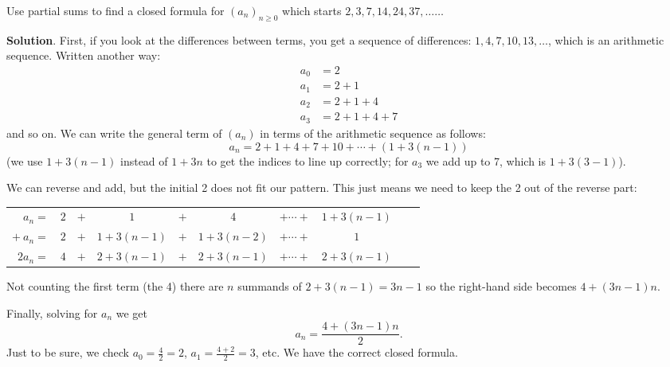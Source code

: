 \documentclass[11pt,]{book}
\theoremstyle{ptxplainnotitle}
\theoremstyle{ptxplaintitle}
\theoremstyle{ptxdefinitionnotitle}
\theoremstyle{ptxdefinitiontitle}
\theoremstyle{ptxdefinitionnotitle}
\theoremstyle{ptxdefinitiontitle}
\theoremstyle{ptxdefinitionnotitle}
\theoremstyle{ptxdefinitiontitle}
\theoremstyle{ptxdefinitiontitlenonumber}
\theoremstyle{ptxdefinitiontitlenonumber}
\numberwithin{equation}{chapter}
\newcommand{\hrulethin}  {\noalign{\hrule height 0.04em}}
\renewcommand{\d}{\displaystyle}
\newcommand{\amp}{&}
\begin{document}
\begin{example}\label{example-sum-of-arithmetic}
\hypertarget{p-203}{}%
Use partial sums to find a closed formula for \((a_n)_{n\ge 0}\) which starts \(2, 3, 7, 14, 24, 37,\ldots \ldots\)%
\par\smallskip%
\noindent\textbf{Solution}.\hypertarget{solution-17}{}\quad%
\hypertarget{p-204}{}%
First, if you look at the differences between terms, you get a sequence of differences: \(1,4,7,10,13, \ldots\), which is an arithmetic sequence.  Written another way:%
\begin{align*}
a_0 \amp = 2\\
a_1 \amp = 2+1\\
a_2 \amp = 2+1+4\\
a_3 \amp = 2+1+4+7
\end{align*}
and so on. We can write the general term of \((a_n)\) in terms of the arithmetic sequence as follows:%
\begin{equation*}
a_n = 2 + 1 + 4 + 7 + 10 + \cdots + (1+3(n-1))
\end{equation*}
(we use \(1+3(n-1)\) instead of \(1+3n\) to get the indices to line up correctly; for \(a_3\) we add up to 7, which is \(1+3(3-1)\)).%
\par
\hypertarget{p-205}{}%
We can reverse and add, but the initial 2 does not fit our pattern.  This just means we need to keep the 2 out of the reverse part:%
\begin{sidebyside}{1}{0}{0}{0}
\begin{sbspanel}{1}
{\centering%
\begin{tabular}{rccccccccc}
\(a_n  =\)&\(2\)&\(+\)&\(1\)&\(+\)&\(4\)&\(+ \cdots +\)&\(1+3(n-1)\)\tabularnewline[0pt]
\(+ ~ a_n  =\)&\(2\)&\(+\)&\(1+3(n-1)\)&\(+\)&\(1+3(n-2)\)&\(+ \cdots +\)&\(1\)\tabularnewline\hrulethin
\(2a_n =\)&\(4\)&\(+\)&\(2+3(n-1)\)&\(+\)&\(2+3(n-1)\)&\(+ \cdots +\)&\(2+3(n-1)\)
\end{tabular}
\par}
\end{sbspanel}
\end{sidebyside}
\par
\hypertarget{p-206}{}%
Not counting the first term (the 4) there are \(n\) summands of \(2+3(n-1) = 3n-1\) so the right-hand side becomes \(4+(3n-1)n\).%
\par
\hypertarget{p-207}{}%
Finally, solving for \(a_n\) we get%
\begin{equation*}
a_n = \d \frac{4+(3n-1)n}{2}.
\end{equation*}
Just to be sure, we check \(a_0 = \frac{4}{2} = 2\), \(a_1 = \frac{4+2}{2} = 3\), etc.  We have the correct closed formula.%
\end{example}
\typeout{************************************************}
\typeout{************************************************}
\end{document}
